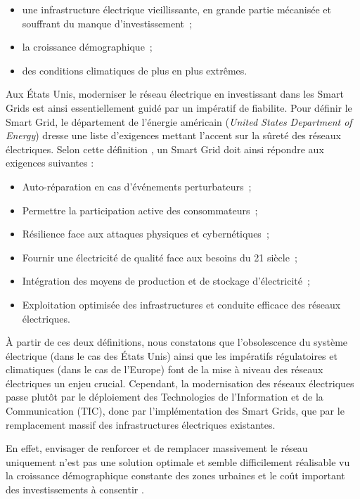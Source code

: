 \begin{itemize}
    \item une infrastructure électrique vieillissante, en grande partie
    mécanisée et souffrant du manque d'investissement~;
    \item la croissance démographique~;
    \item des conditions climatiques de plus en plus extrêmes.
\end{itemize}

Aux États Unis, moderniser le réseau électrique en investissant dans les Smart 
Grids est ainsi essentiellement guidé par un impératif de fiabilite. Pour 
définir le Smart Grid, le département de l'énergie américain (\textit{United 
States Department of Energy}) dresse une liste d'exigences mettant l'accent sur 
la sûreté des réseaux électriques. Selon cette définition \cite{USDE}, un Smart 
Grid doit ainsi répondre aux exigences suivantes :

\begin{itemize}
\item Auto-réparation en cas d'événements perturbateurs~;
\item Permettre la participation active des consommateurs~; 
\item Résilience face aux attaques physiques et cybernétiques~;
\item Fournir une électricité de qualité face aux besoins du 21 siècle~;
\item Intégration des moyens de production et de stockage d'électricité~;
\item Exploitation optimisée des infrastructures et conduite efficace des 
réseaux électriques.
\end{itemize} 

À partir de ces deux définitions, nous constatons que l'obsolescence du système 
électrique (dans le cas des États Unis) ainsi que les impératifs régulatoires et 
climatiques (dans le cas de l'Europe) font de la mise à niveau des réseaux 
électriques un enjeu crucial. Cependant, la modernisation des réseaux 
électriques passe plutôt par le déploiement des Technologies de l'Information et 
de la Communication (TIC), donc par l'implémentation des Smart Grids, que par le 
remplacement massif des infrastructures électriques existantes.

En effet, envisager de renforcer et de remplacer massivement le réseau 
uniquement n'est pas une solution optimale et semble difficilement réalisable vu 
la croissance démographique constante des zones urbaines et le coût important 
des investissements à consentir \cite{cre}.

